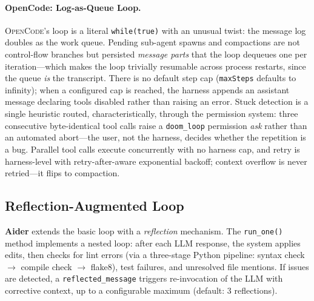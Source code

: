 \documentclass[11pt,a4paper]{article}
\newcommand{\ocd}{\textsc{OpenCode}\xspace}
\begin{document}
\paragraph{OpenCode: Log-as-Queue Loop.}
\ocd{}'s loop is a literal \texttt{while(true)} with an unusual twist: the message log doubles as the work queue.
Pending sub-agent spawns and compactions are not control-flow branches but persisted \emph{message parts} that the loop dequeues one per iteration---which makes the loop trivially resumable across process restarts, since the queue \emph{is} the transcript.
There is no default step cap (\texttt{maxSteps} defaults to infinity); when a configured cap is reached, the harness appends an assistant message declaring tools disabled rather than raising an error.
Stuck detection is a single heuristic routed, characteristically, through the permission system: three consecutive byte-identical tool calls raise a \texttt{doom\_loop} permission \emph{ask} rather than an automated abort---the user, not the harness, decides whether the repetition is a bug.
Parallel tool calls execute concurrently with no harness cap, and retry is harness-level with retry-after-aware exponential backoff; context overflow is never retried---it flips to compaction.

\subsection{Reflection-Augmented Loop}

\textbf{Aider} extends the basic loop with a \emph{reflection} mechanism.
The \texttt{run\_one()} method implements a nested loop: after each LLM response, the system applies edits, then checks for lint errors (via a three-stage Python pipeline: syntax check $\to$ compile check $\to$ flake8), test failures, and unresolved file mentions.
If issues are detected, a \texttt{reflected\_message} triggers re-invocation of the LLM with corrective context, up to a configurable maximum (default: 3 reflections).
\end{document}
